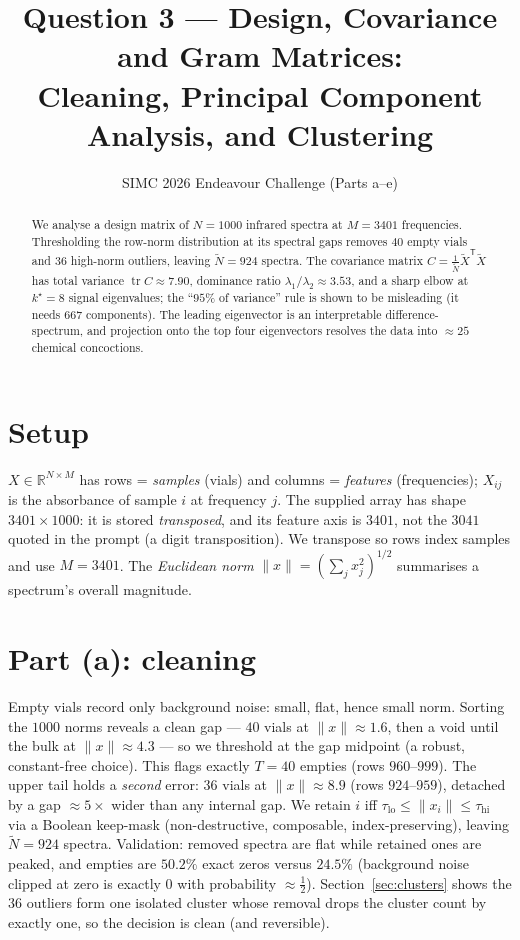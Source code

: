 \documentclass[12pt]{article}
\title{\vspace{-1.2cm}\bfseries Question 3 --- Design, Covariance and Gram Matrices:\\[2pt]
\large Cleaning, Principal Component Analysis, and Clustering}
\author{SIMC 2026 Endeavour Challenge \quad(Parts a--e)}
\date{}
\DeclareMathOperator{\tr}{tr}
\newcommand{\R}{\mathbb{R}}
\newcommand{\Xt}{\widetilde{X}}
\newcommand{\Nt}{\widetilde{N}}
\newcommand{\norm}[1]{\lVert #1 \rVert}
\newcommand{\T}{^{\mathsf{T}}}
\theoremstyle{definition}\newtheorem{definition}{Definition}
\theoremstyle{plain}\newtheorem{proposition}{Proposition}
\begin{document}
\maketitle
\vspace{-0.7cm}

\begin{abstract}\noindent\small
We analyse a design matrix of $N=1000$ infrared spectra at $M=3401$ frequencies. Thresholding
the row-norm distribution at its spectral gaps removes $40$ empty vials and $36$ high-norm
outliers, leaving $\Nt=924$ spectra. The covariance matrix $C=\tfrac1{\Nt}\Xt\T\Xt$ has total
variance $\tr C\approx7.90$, dominance ratio $\lambda_1/\lambda_2\approx3.53$, and a sharp
elbow at $k^\star=8$ signal eigenvalues; the ``$95\%$ of variance'' rule is shown to be
misleading (it needs $667$ components). The leading eigenvector is an interpretable
difference-spectrum, and projection onto the top four eigenvectors resolves the data into
$\approx25$ chemical concoctions.
\end{abstract}

\section{Setup}\label{sec:setup}
$X\in\R^{N\times M}$ has rows = \emph{samples} (vials) and columns = \emph{features}
(frequencies); $X_{ij}$ is the absorbance of sample $i$ at frequency $j$. The supplied array
has shape $3401\times1000$: it is stored \emph{transposed}, and its feature axis is $3401$, not
the $3041$ quoted in the prompt (a digit transposition). We transpose so rows index samples and
use $M=3401$. The \emph{Euclidean norm} $\norm{x}=(\sum_j x_j^2)^{1/2}$ summarises a spectrum's
overall magnitude.

\section{Part (a): cleaning}\label{sec:clean}
Empty vials record only background noise: small, flat, hence small norm. Sorting the $1000$ norms
reveals a clean gap --- $40$ vials at $\norm{x}\approx1.6$, then a void until the bulk at
$\norm{x}\approx4.3$ --- so we threshold at the gap midpoint (a robust, constant-free choice).
This flags exactly $T=40$ empties (rows $960$--$999$). The upper tail holds a \emph{second} error:
$36$ vials at $\norm{x}\approx8.9$ (rows $924$--$959$), detached by a gap $\approx5\times$ wider
than any internal gap. We retain $i$ iff $\tau_{\mathrm{lo}}\!\le\!\norm{x_i}\!\le\!\tau_{\mathrm{hi}}$
via a Boolean keep-mask (non-destructive, composable, index-preserving), leaving $\Nt=924$ spectra.
Validation: removed spectra are flat while retained ones are peaked, and empties are $50.2\%$ exact
zeros versus $24.5\%$ (background noise clipped at zero is exactly $0$ with probability $\approx\!\tfrac12$).
Section~\ref{sec:clusters} shows the $36$ outliers form one isolated cluster whose removal drops the
cluster count by exactly one, so the decision is clean (and reversible).
\end{document}
